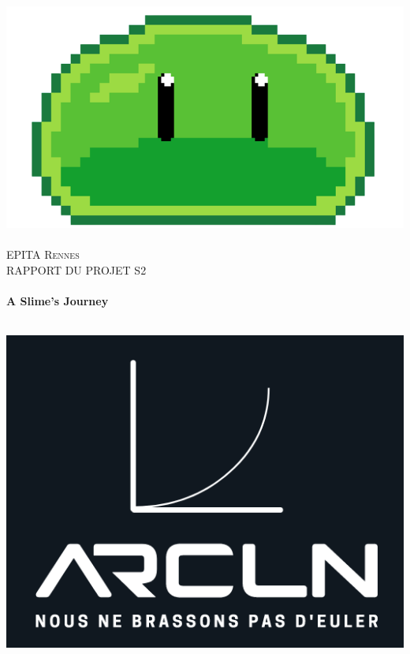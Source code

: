 
\begin{titlepage}
  \begin{sffamily}
  \begin{center}

  
    \includegraphics[scale=0.3]{logo}~\\[1.5cm]

    \textsc{\LARGE EPITA Rennes}\\[0.5cm]

    \textsc{\Large RAPPORT DU PROJET S2}\\[1.5cm]

    \HRule \\[0.4cm]
     { \huge \bfseries  A Slime's Journey \\[0.4cm] }

    \HRule \\[2cm]
    \includegraphics[scale=0.4]{arcln}
     \\[0.5cm]


\end{center}
\end{sffamily}
\end{titlepage}
